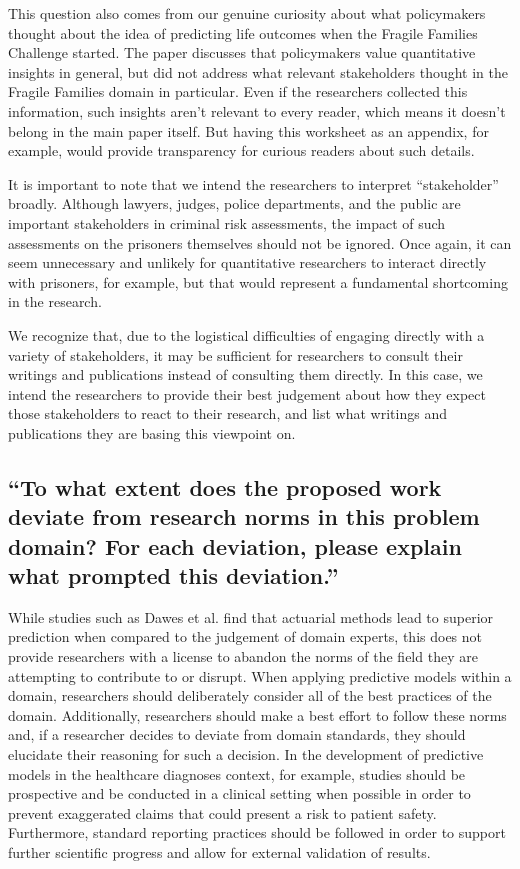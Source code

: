 \documentclass[12pt]{article}
\begin{document}
		This question also comes from our genuine curiosity about what policymakers thought about the idea of predicting life outcomes when the Fragile Families Challenge started. The paper discusses that policymakers value quantitative insights in general, but did not address what relevant stakeholders thought in the Fragile Families domain in particular. Even if the researchers collected this information, such insights aren't relevant to every reader, which means it doesn't belong in the main paper itself. But having this worksheet as an appendix, for example, would provide transparency for curious readers about such details.

		It is important to note that we intend the researchers to interpret ``stakeholder'' broadly. Although lawyers, judges, police departments, and the public are important stakeholders in criminal risk assessments, the impact of such assessments on the prisoners themselves should not be ignored. Once again, it can seem unnecessary and unlikely for quantitative researchers to interact directly with prisoners, for example, but that would represent a fundamental shortcoming in the research. 

		We recognize that, due to the logistical difficulties of engaging directly with a variety of stakeholders, it may be sufficient for researchers to consult their writings and publications instead of consulting them directly. In this case, we intend the researchers to provide their best judgement about how they expect those stakeholders to react to their research, and list what writings and publications they are basing this viewpoint on.

	\subsection{``To what extent does the proposed work deviate from research norms in this problem domain? For each deviation, please explain what prompted this deviation.''}

		While studies such as Dawes et al. \cite{actuarial} find that actuarial methods lead to superior prediction when compared to the judgement of domain experts, this does not provide researchers with a license to abandon the norms of the field they are attempting to contribute to or disrupt. When applying predictive models within a domain, researchers should deliberately consider all of the best practices of the domain. Additionally, researchers should make a best effort to follow these norms and, if a researcher decides to deviate from domain standards, they should elucidate their reasoning for such a decision. In the development of predictive models in the healthcare diagnoses context, for example, studies should be prospective and be conducted in a clinical setting when possible in order to prevent exaggerated claims that could present a risk to patient safety. Furthermore, standard reporting practices should be followed in order to support further scientific progress and allow for external validation of results.
\end{document}
